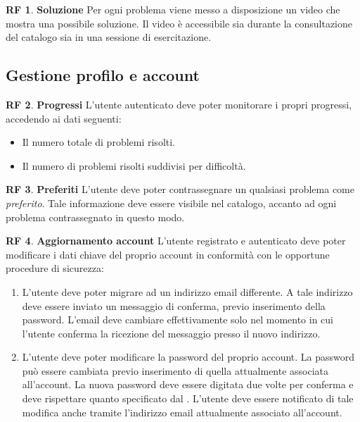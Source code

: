 \documentclass[11pt, a4paper]{article}
\theoremstyle{definition}
\newtheorem{funcreq}{RF} %
\begin{document}
\begin{funcreq}
\textbf{Soluzione }
Per ogni problema viene messo a disposizione un video che mostra una
possibile soluzione. Il video è accessibile sia durante la consultazione
del catalogo sia in una sessione di esercitazione.
\end{funcreq}

\subsection{Gestione profilo e account}

\begin{funcreq}
\label{stats}
\textbf{Progressi }
L'utente autenticato deve poter monitorare i propri progressi, accedendo ai dati
seguenti:
\begin{itemize}
    \item Il numero totale di problemi risolti.
    \item Il numero di problemi risolti suddivisi per difficoltà.
\end{itemize}
\end{funcreq}

\begin{funcreq}
\textbf{Preferiti }
L'utente deve poter contrassegnare un qualsiasi problema come \textit{preferito}.
Tale informazione deve essere visibile nel catalogo, accanto ad ogni problema
contrassegnato in questo modo.
\end{funcreq}


\begin{funcreq}
\label{updateaccount}
\textbf{Aggiornamento account }
L'utente registrato e autenticato deve poter modificare i dati chiave del
proprio account in conformità con le opportune procedure di sicurezza:
\begin{enumerate}
\item L'utente deve poter migrare ad un indirizzo email differente. A tale
indirizzo deve essere inviato un messaggio di conferma, previo inserimento
della password. L'email
deve cambiare effettivamente solo nel momento in cui l'utente conferma la
ricezione del messaggio presso il nuovo indirizzo.

\item L'utente deve poter modificare la password del proprio account.
La password può essere cambiata previo inserimento di quella attualmente
associata all'account. La nuova password deve essere digitata due volte
per conferma e deve rispettare quanto specificato dal
\textcolor{blue}{}. 
L'utente deve essere notificato di tale modifica anche tramite
l'indirizzo email attualmente associato all'account.
\end{enumerate}
\end{funcreq}
\end{document}
